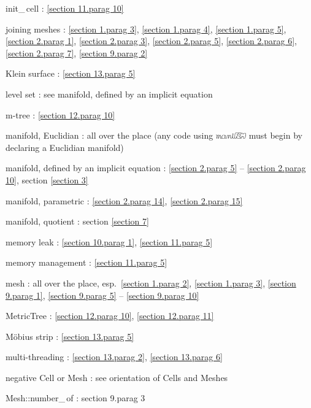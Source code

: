 \documentclass[a4paper]{scrreprt}
\def\numb{}
\newcommand\maniFEM{\leavevmode\hbox{\includegraphics[width=13mm]{manifem-small}}}
\newcommand\verm[1]{\textcolor{manif}{#1}}
\renewcommand\tt{\normalfont\ttfamily}
\begin{document}
\noindent
{\small\tt init\_\,cell} : \ref{\numb section 11.\numb parag 10}

\noindent
{\small\tt join}ing meshes : \ref{\numb section 1.\numb parag 3},
\ref{\numb section 1.\numb parag 4}, \ref{\numb section 1.\numb parag 5},
\ref{\numb section 2.\numb parag 1}, \ref{\numb section 2.\numb parag 3},
\ref{\numb section 2.\numb parag 5}, \ref{\numb section 2.\numb parag 6},
\ref{\numb section 2.\numb parag 7}, \ref{\numb section 9.\numb parag 2}

\noindent
Klein surface : \ref{\numb section 13.\numb parag 5}

\noindent
level set : see manifold, defined by an implicit equation

\noindent
m-tree : \ref{\numb section 12.\numb parag 10}

\noindent
manifold, Euclidian : all over the place\hfil\break
\hglue 15mm (any code using {\maniFEM} must begin by declaring a Euclidian manifold)

\noindent
manifold, defined by an implicit equation :
\ref{\numb section 2.\numb parag 5} -- \ref{\numb section 2.\numb parag 10},
section \ref{\numb section 3}

\noindent
manifold, parametric : \ref{\numb section 2.\numb parag 14},
\ref{\numb section 2.\numb parag 15}

\noindent
manifold, quotient : section \ref{\numb section 7}

\noindent
memory leak : \ref{\numb section 10.\numb parag 1}, \ref{\numb section 11.\numb parag 5}

\noindent
memory management : \ref{\numb section 11.\numb parag 5}

\noindent
mesh : all over the place, esp.\ \ref{\numb section 1.\numb parag 2},
\ref{\numb section 1.\numb parag 3}, \ref{\numb section 9.\numb parag 1},
\ref{\numb section 9.\numb parag 5} -- \ref{\numb section 9.\numb parag 10}

\noindent
{\small\tt \verm{MetricTree}} : \ref{\numb section 12.\numb parag 10},
\ref{\numb section 12.\numb parag 11}

\noindent
M\"obius strip : \ref{\numb section 13.\numb parag 5}

\noindent
multi-threading : \ref{\numb section 13.\numb parag 2}, \ref{\numb section 13.\numb parag 6}

\noindent
negative {\small\tt \verm{Cell}} or {\small\tt \verm{Mesh}} :
see orientation of {\small\tt \verm{Cell}}s and {\small\tt \verm{Mesh}}es

\noindent
{\small\tt\verm{Mesh}::number\_\,of} : {\numb section 9.\numb parag 3}
\end{document}
